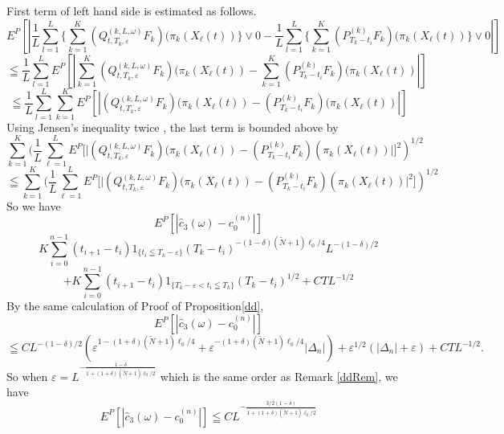 \documentclass[12pt]{article}
\begin{document}
First term of left hand side is estimated as follows.
$$E^P[|
\frac{1}{L}\sum_{l=1}^L\{\sum_{k=1}^{K} (Q_{t,T_k,\varepsilon}^{(k,L,\omega)}F_k)(\pi_k (X_{\ell}(t))\}\vee 0
-\frac{1}{L}\sum_{l=1}^L\{\sum_{k=1}^{K} (P_{T_k-t_i}^{(k)}F_k)(\pi_k (X_{\ell}(t))\}\vee 0|]$$
$$\leqq \frac{1}{L}\sum_{l=1}^L E^P[|
\sum_{k=1}^{K} (Q_{t,T_k,\varepsilon}^{(k,L,\omega)}F_k)(\pi_k (X_{\ell}(t))
-\sum_{k=1}^{K} (P_{T_k-t_i}^{(k)}F_k)(\pi_k (X_{\ell}(t))|]$$
$$\leqq \frac{1}{L}\sum_{l=1}^L \sum_{k=1}^{K} E^P[|
 (Q_{t,T_k,\varepsilon}^{(k,L,\omega)}F_k)(\pi_k (X_{\ell}(t))
- (P_{T_k-t_i}^{(k)}F_k)(\pi_k (X_{\ell}(t))|]$$
Using Jensen's inequality twice , the last term is bounded above by
$$ \sum_{k=1}^{K}( \frac{1}{L} \sum_{\ell=1}^L E^P[|
 (Q_{t,T_k,\varepsilon}^{(k,L,\omega)}F_k)(\pi_k (X_{\ell}(t))
- (P_{T_k-t_i}^{(k)}F_k)(\pi_k (X_{\ell}(t))|]^2)^{1/2}$$
$$\leqq \sum_{k=1}^{K}( \frac{1}{L} \sum_{\ell=1}^L E^P[|
 (Q_{t,T_k,\varepsilon}^{(k,L,\omega)}F_k)(\pi_k (X_{\ell}(t))
- (P_{T_k-t_i}^{(k)}F_k)(\pi_k (X_{\ell}(t))|^2])^{1/2}$$
So we have
$$E^P[|\hat{c}_3(\omega)-c_0^{(n)}|]$$
$$K \sum_{i=0}^{n-1} (t_{i+1}-t_i) 1_{\{t_i\leqq T_k-\varepsilon\}}(T_k-t_i)^{-(1-\delta)(\tilde{N}+1)\ell_0/4}L^{-(1-\delta)/2}$$
$$+K \sum_{i=0}^{n-1} (t_{i+1}-t_i) 1_{\{T_k-\varepsilon < t_i \leqq T_k\}}(T_k-t_i)^{1/2}+CTL^{-1/2}$$
By the same calculation of Proof of Proposition\ref{dd},
$$E^P[|\hat{c}_3(\omega)-c_0^{(n)}|]$$
$$\leqq C L^{-(1-\delta)/2}(\varepsilon^{1-(1+\delta)(\tilde{N}+1)\ell_0/4} + \varepsilon^{-(1+\delta)(\tilde{N}+1)\ell_0/4} |\Delta_n|)+\varepsilon^{1/2} (|\Delta_n|+\varepsilon)+CTL^{-1/2}.$$
So when $\varepsilon = L^{-\frac{1-\delta}{1+(1+\delta)(\tilde{N}+1)\ell_0/2}}$ which is the same 
order as Remark \ref{ddRem},
we have
$$E^P[|\hat{c}_3(\omega)-c_0^{(n)}|]\leqq C L^{-\frac{3/2(1-\delta)}{1+(1+\delta)(\tilde{N}+1)\ell_0/2}}$$
\end{document}
